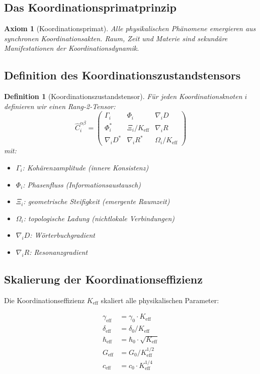 \documentclass[11pt,a4paper]{article}
\newtheorem{axiom}{Axiom}
\newtheorem{definition}{Definition}
\begin{document}
	\subsection{Das Koordinationsprimatprinzip}
	\begin{axiom}[Koordinationsprimat]
		Alle physikalischen Phänomene emergieren aus synchronen Koordinationsakten.
		Raum, Zeit und Materie sind sekundäre Manifestationen der Koordinationsdynamik.
	\end{axiom}
	
	\subsection{Definition des Koordinationszustandstensors}
	
	\begin{definition}[Koordinationszustandstensor]
		Für jeden Koordinationsknoten $i$ definieren wir einen Rang-2-Tensor:
		\[
		\hat{C}_i^{\alpha\beta} = \begin{pmatrix}
			\Gamma_i & \Phi_i & \nabla_i D \\
			\Phi_i^* & \Xi_i/K_{\mathrm{eff}} & \nabla_i R \\
			\nabla_i D^* & \nabla_i R^* & \Omega_i/K_{\mathrm{eff}}
		\end{pmatrix}
		\]
		mit:
		\begin{itemize}
			\item $\Gamma_i$: Kohärenzamplitude (innere Konsistenz)
			\item $\Phi_i$: Phasenfluss (Informationsaustausch)  
			\item $\Xi_i$: geometrische Steifigkeit (emergente Raumzeit)
			\item $\Omega_i$: topologische Ladung (nichtlokale Verbindungen)
			\item $\nabla_i D$: Wörterbuchgradient
			\item $\nabla_i R$: Resonanzgradient
		\end{itemize}
	\end{definition}
	
	\subsection{Skalierung der Koordinationseffizienz}
	
	Die Koordinationseffizienz $K_{\mathrm{eff}}$ skaliert alle physikalischen Parameter:
	
	\[
	\begin{aligned}
		\gamma_{\mathrm{eff}} &= \gamma_0 \cdot K_{\mathrm{eff}} \\
		\delta_{\mathrm{eff}} &= \delta_0 / K_{\mathrm{eff}} \\
		\hbar_{\mathrm{eff}} &= \hbar_0 \cdot \sqrt{K_{\mathrm{eff}}} \\
		G_{\mathrm{eff}} &= G_0 / K_{\mathrm{eff}}^{1/2} \\
		c_{\mathrm{eff}} &= c_0 \cdot K_{\mathrm{eff}}^{1/4}
	\end{aligned}
	\]
	
\end{document}
